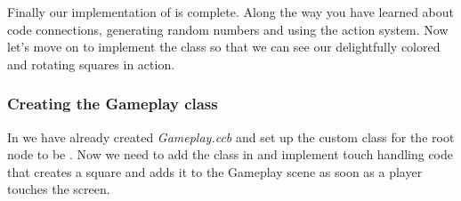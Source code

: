 Finally our implementation of  is complete. Along the way you
have learned about code connections, generating random numbers and using the
action system. Now let's move on to implement the  class so
that we can see our delightfully colored and rotating squares in action.

\subsubsection{Creating the Gameplay class}

In \SB{} we have already created \textit{Gameplay.ccb} and set up the custom
class for the root node to be . Now we need to add the
 class in \xcode{} and implement touch handling code that
creates a square and adds it to the Gameplay scene as soon as a player touches
the screen.
